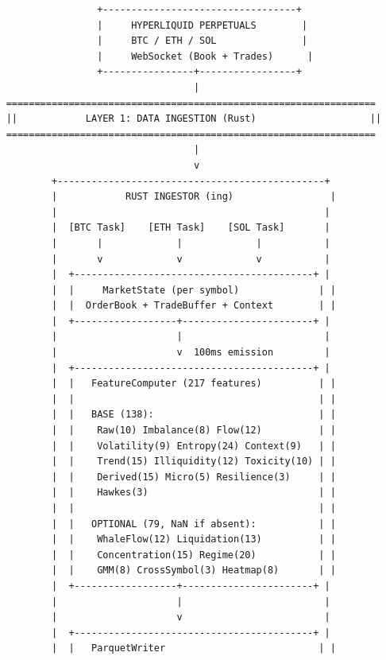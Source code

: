 \documentclass[11pt,a4paper]{article}
\begin{document}
{\small
\begin{verbatim}
                    +----------------------------------+
                    |     HYPERLIQUID PERPETUALS        |
                    |     BTC / ETH / SOL               |
                    |     WebSocket (Book + Trades)      |
                    +----------------+-----------------+
                                     |
    =================================================================
    ||            LAYER 1: DATA INGESTION (Rust)                    ||
    =================================================================
                                     |
                                     v
            +-----------------------------------------------+
            |            RUST INGESTOR (ing)                 |
            |                                               |
            |  [BTC Task]    [ETH Task]    [SOL Task]       |
            |       |             |             |           |
            |       v             v             v           |
            |  +------------------------------------------+ |
            |  |     MarketState (per symbol)              | |
            |  |  OrderBook + TradeBuffer + Context        | |
            |  +------------------+-----------------------+ |
            |                     |                         |
            |                     v  100ms emission         |
            |  +------------------------------------------+ |
            |  |   FeatureComputer (217 features)          | |
            |  |                                           | |
            |  |   BASE (138):                             | |
            |  |    Raw(10) Imbalance(8) Flow(12)          | |
            |  |    Volatility(9) Entropy(24) Context(9)   | |
            |  |    Trend(15) Illiquidity(12) Toxicity(10) | |
            |  |    Derived(15) Micro(5) Resilience(3)     | |
            |  |    Hawkes(3)                              | |
            |  |                                           | |
            |  |   OPTIONAL (79, NaN if absent):           | |
            |  |    WhaleFlow(12) Liquidation(13)          | |
            |  |    Concentration(15) Regime(20)           | |
            |  |    GMM(8) CrossSymbol(3) Heatmap(8)       | |
            |  +------------------+-----------------------+ |
            |                     |                         |
            |                     v                         |
            |  +------------------------------------------+ |
            |  |   ParquetWriter                           | |

\end{verbatim}}
\end{document}
